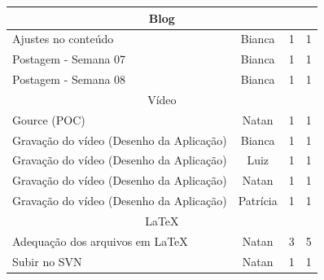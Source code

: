 \begin{apendicesenv}
\begin{quadro}[htb]
\begin{tabular}{|l|c|c|c|}
    \multicolumn{4}{|c|}{Blog} \\ \hline
    Ajustes no conteúdo  & Bianca    & 1  & 1    \\ \hline
    Postagem - Semana 07      & Bianca    & 1  & 1    \\ \hline
    Postagem - Semana 08      & Bianca     & 1 & 1   \\ \hline
    
    \multicolumn{4}{|c|}{Vídeo} \\ \hline
    Gource (POC) & Natan &  1 &  1  \\ \hline 
    Gravação do vídeo (Desenho da Aplicação) & Bianca & 1 & 1    \\ \hline
    Gravação do vídeo (Desenho da Aplicação) & Luiz & 1  & 1    \\ \hline
    Gravação do vídeo (Desenho da Aplicação) & Natan & 1  & 1    \\ \hline
    Gravação do vídeo (Desenho da Aplicação) & Patrícia & 1  & 1    \\ \hline
    
    \multicolumn{4}{|c|}{LaTeX} \\ \hline
    Adequação dos arquivos em LaTeX & Natan & 3 & 5   \\ \hline 
    Subir no SVN & Natan & 1 & 1   \\ \hline
    
\end{tabular}
\end{quadro}
\FloatBarrier


\end{apendicesenv}
